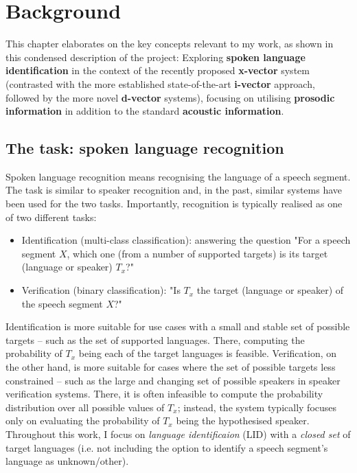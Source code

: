 \documentclass[bsc,frontabs,twoside,singlespacing,parskip,deptreport]{infthesis}
\begin{document}
\chapter{Background}{
  \label{chap:Background}
  This chapter elaborates on the key concepts relevant to my work, as shown in this condensed description of the project: Exploring \textbf{spoken language identification} in the context of the recently proposed \textbf{x-vector} system (contrasted with the more established state-of-the-art \textbf{i-vector} approach, followed by the more novel \textbf{d-vector} systems), focusing on utilising \textbf{prosodic information} in addition to the standard \textbf{acoustic information}.

  \section{The task: spoken language recognition}{
    \label{sec:LID}
    Spoken language recognition means recognising the language of a speech segment. The task is similar to speaker recognition and, in the past, similar systems have been used for the two tasks. Importantly, recognition is typically realised as one of two different tasks: 
    \begin{itemize}
      \item {Identification (multi-class classification): answering the question "For a speech segment $X$, which one (from a number of supported targets) is its target (language or speaker) $T_x$?"}
      \item {Verification (binary classification): "Is $T_x$ the target (language or speaker) of the speech segment $X$?"}
    \end{itemize}
    Identification is more suitable for use cases with a small and stable set of possible targets -- such as the set of supported languages. There, computing the probability of $T_x$ being each of the target languages is feasible. Verification, on the other hand, is more suitable for cases where the set of possible targets less constrained -- such as the large and changing set of possible speakers in speaker verification systems. There, it is often infeasible to compute the probability distribution over all possible values of $T_x$; instead, the system typically focuses only on evaluating the probability of $T_x$ being the hypothesised speaker. Throughout this work, I focus on \textit{language identificaion} (LID) with a \textit{closed set} of target languages (i.e. not including the option to identify a speech segment's language  as unknown/other).
  }

}
\end{document}
